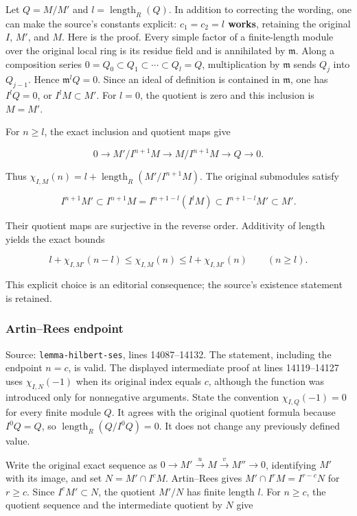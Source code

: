Let \(Q=M/M'\) and \(l=\operatorname{length}_R(Q)\). In addition to correcting the wording, one can make the source's constants explicit: \textbf{\(c_1=c_2=l\) works}, retaining the original \(I\), \(M'\), and \(M\). Here is the proof. Every simple factor of a finite-length module over the original local ring is its residue field and is annihilated by \(\mathfrak m\). Along a composition series \(0=Q_0\subset Q_1\subset\cdots\subset Q_l=Q\), multiplication by \(\mathfrak m\) sends \(Q_j\) into \(Q_{j-1}\). Hence \(\mathfrak m^lQ=0\). Since an ideal of definition is contained in \(\mathfrak m\), one has \(I^lQ=0\), or \(I^lM\subset M'\). For \(l=0\), the quotient is zero and this inclusion is \(M=M'\).

For \(n\geq l\), the exact inclusion and quotient maps give

\[
0\longrightarrow M'/I^{n+1}M\longrightarrow M/I^{n+1}M
\longrightarrow Q\longrightarrow0.
\]

Thus \(\chi_{I,M}(n)=l+\operatorname{length}_R(M'/I^{n+1}M)\). The original submodules satisfy

\[
I^{n+1}M'\subset I^{n+1}M
 =I^{n+1-l}(I^lM)\subset I^{n+1-l}M'\subset M'.
\]

Their quotient maps are surjective in the reverse order. Additivity of length yields the exact bounds

\[
l+\chi_{I,M'}(n-l)\leq\chi_{I,M}(n)
\leq l+\chi_{I,M'}(n)\qquad(n\geq l).
\]

This explicit choice is an editorial consequence; the source's existence statement is retained.

\subsubsection{Artin--Rees endpoint}\label{artinrees-endpoint}

Source: \texttt{lemma-hilbert-ses}, lines 14087--14132. The statement, including the endpoint \(n=c\), is valid. The displayed intermediate proof at lines 14119--14127 uses \(\chi_{I,N}(-1)\) when its original index equals \(c\), although the function was introduced only for nonnegative arguments. State the convention \(\chi_{I,Q}(-1)=0\) for every finite module \(Q\). It agrees with the original quotient formula because \(I^0Q=Q\), so \(\operatorname{length}_R(Q/I^0Q)=0\). It does not change any previously defined value.

Write the original exact sequence as \(0\to M'\xrightarrow{u}M\xrightarrow{v}M''\to0\), identifying \(M'\) with its image, and set \(N=M'\cap I^cM\). Artin--Rees gives \(M'\cap I^rM=I^{r-c}N\) for \(r\geq c\). Since \(I^cM'\subset N\), the quotient \(M'/N\) has finite length \(l\). For \(n\geq c\), the quotient sequence and the intermediate quotient by \(N\) give

